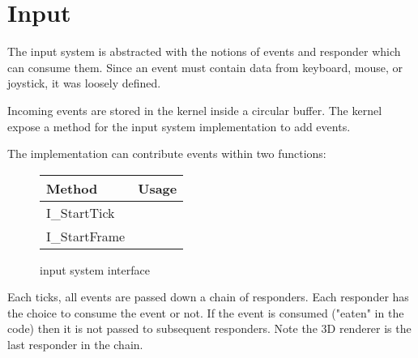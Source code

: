 \section{Input}
The input system is abstracted with the notions of events and responder which can consume them. Since an event must contain data from keyboard, mouse, or joystick, it was loosely defined.\\
\par
{}
\par
Incoming events are stored in the kernel inside a circular buffer. The kernel expose a method for the input system implementation to add events.\\
\par
{}
\par
{}
\par
The implementation can contribute events within two functions:\\
\par
\begin{figure}[H]
\centering  
\begin{tabularx}{\textwidth}{ L{0.6}  L{1.4}}
  \toprule
  \textbf{Method} &  \textbf{Usage}\\

  \toprule 
  
I\_StartTick &\\
I\_StartFrame &\\

   \toprule
\end{tabularx}
\caption{\doom input system interface}
\end{figure}
\par


Each ticks, all events are passed down a chain of responders. Each responder has the choice to consume the event or not. If the event is consumed ("eaten" in the code) then it is not passed to subsequent responders. Note the 3D renderer is the last responder in the chain.\\
\par
{}
\par

